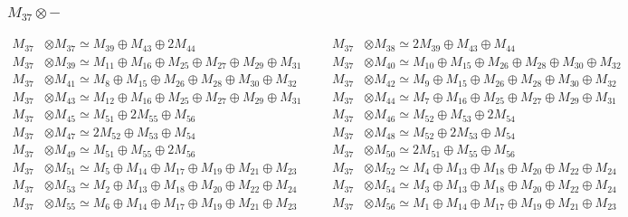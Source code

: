 \subsubsection{$ M_{37}\otimes -$}
\begin{align*}
M_{37} &\otimes M_{37} \simeq M_{39} \oplus M_{43} \oplus 2M_{44} &&& M_{37} &\otimes M_{38} \simeq 2M_{39} \oplus M_{43} \oplus M_{44}\\
M_{37} &\otimes M_{39} \simeq M_{11} \oplus M_{16} \oplus M_{25} \oplus M_{27} \oplus M_{29} \oplus M_{31} &&& M_{37} &\otimes M_{40} \simeq M_{10} \oplus M_{15} \oplus M_{26} \oplus M_{28} \oplus M_{30} \oplus M_{32}\\
M_{37} &\otimes M_{41} \simeq M_{8} \oplus M_{15} \oplus M_{26} \oplus M_{28} \oplus M_{30} \oplus M_{32} &&& M_{37} &\otimes M_{42} \simeq M_{9} \oplus M_{15} \oplus M_{26} \oplus M_{28} \oplus M_{30} \oplus M_{32}\\
M_{37} &\otimes M_{43} \simeq M_{12} \oplus M_{16} \oplus M_{25} \oplus M_{27} \oplus M_{29} \oplus M_{31} &&& M_{37} &\otimes M_{44} \simeq M_{7} \oplus M_{16} \oplus M_{25} \oplus M_{27} \oplus M_{29} \oplus M_{31}\\
M_{37} &\otimes M_{45} \simeq M_{51} \oplus 2M_{55} \oplus M_{56} &&& M_{37} &\otimes M_{46} \simeq M_{52} \oplus M_{53} \oplus 2M_{54}\\
M_{37} &\otimes M_{47} \simeq 2M_{52} \oplus M_{53} \oplus M_{54} &&& M_{37} &\otimes M_{48} \simeq M_{52} \oplus 2M_{53} \oplus M_{54}\\
M_{37} &\otimes M_{49} \simeq M_{51} \oplus M_{55} \oplus 2M_{56} &&& M_{37} &\otimes M_{50} \simeq 2M_{51} \oplus M_{55} \oplus M_{56}\\
M_{37} &\otimes M_{51} \simeq M_{5} \oplus M_{14} \oplus M_{17} \oplus M_{19} \oplus M_{21} \oplus M_{23} &&& M_{37} &\otimes M_{52} \simeq M_{4} \oplus M_{13} \oplus M_{18} \oplus M_{20} \oplus M_{22} \oplus M_{24}\\
M_{37} &\otimes M_{53} \simeq M_{2} \oplus M_{13} \oplus M_{18} \oplus M_{20} \oplus M_{22} \oplus M_{24} &&& M_{37} &\otimes M_{54} \simeq M_{3} \oplus M_{13} \oplus M_{18} \oplus M_{20} \oplus M_{22} \oplus M_{24}\\
M_{37} &\otimes M_{55} \simeq M_{6} \oplus M_{14} \oplus M_{17} \oplus M_{19} \oplus M_{21} \oplus M_{23} &&& M_{37} &\otimes M_{56} \simeq M_{1} \oplus M_{14} \oplus M_{17} \oplus M_{19} \oplus M_{21} \oplus M_{23}\\
\end{align*}

